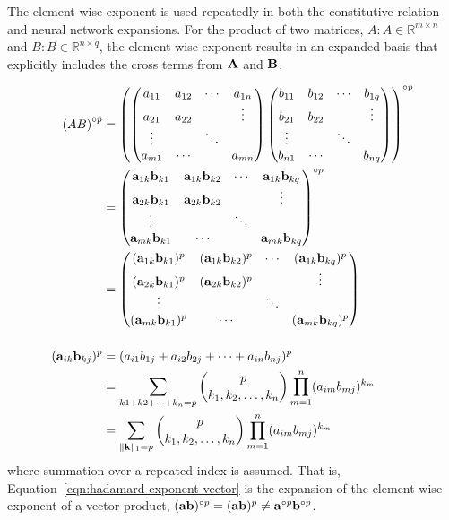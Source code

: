 {\color{red}
The element-wise exponent is used repeatedly in both the constitutive relation and neural network expansions. For the product of two matrices, $A: A \in \mathbb{R}^{m \times n}$ and $B: B \in \mathbb{R}^{n \times q}$, the element-wise exponent results in an expanded basis that explicitly includes the cross terms from ${\bf A}$ and ${\bf B}$.

\begin{subequations}
\begin{align}
        \left( AB \right)^{\circ p} &= \he[\left( \densematrix{a}{m}{n} \densematrix{b}{n}{q} \right)]{p} \nonumber \\
            &= \begin{pmatrix}
                {\bf a}_{1k}{\bf b}_{k1}  & {\bf a}_{1k}{\bf b}_{k2}    & \cdots    & {\bf a}_{1k}{\bf b}_{kq}   \\
                {\bf a}_{2k}{\bf b}_{k1}  & {\bf a}_{2k}{\bf b}_{k2}    &           & \vdots \\
                \vdots                    &                             & \ddots    &          \\
                {\bf a}_{mk}{\bf b}_{k1}  & \cdots                      &           & {\bf a}_{mk}{\bf b}_{kq}
            \end{pmatrix}^{\circ p} \nonumber \\
            &= \begin{pmatrix}
                ({\bf a}_{1k}{\bf b}_{k1})^{p}  & ({\bf a}_{1k}{\bf b}_{k2})^{p}    & \cdots    & ({\bf a}_{1k}{\bf b}_{kq})^{p}   \\
                ({\bf a}_{2k}{\bf b}_{k1})^{p}  & ({\bf a}_{2k}{\bf b}_{k2})^{p}    &           & \vdots \\
                \vdots                          &                                   & \ddots           &          \\
                ({\bf a}_{mk}{\bf b}_{k1})^{p}  & \cdots                            &           & ({\bf a}_{mk}{\bf b}_{kq})^{p}
            \end{pmatrix} \label{eqn:hadmard exponent matrix} \\[3ex]
        ({\bf a}_{ik}{\bf b}_{kj})^{p} &= (a_{i1}b_{1j} + a_{i2}b_{2j} + \cdots + a_{in}b_{nj})^p \nonumber \\
            &= \sum_{k1 + k2 + \cdots + k_n = p} \binom{p}{k_1, k_2, \ldots, k_n} \prod_{m=1}^n (a_{im}b_{mj})^{k_m} \nonumber \\
            &= \sum_{\| {\bf k} \|_1 = p} \binom{p}{k_1, k_2, \ldots, k_n} \prod_{m=1}^n (a_{im}b_{mj})^{k_m} \\%
    \label{eqn:hadamard exponent vector}
\end{align}
\label{eqn:nondistributive hadamard}
\end{subequations}
where summation over a repeated index is assumed. That is, Equation~\ref{eqn:hadamard exponent vector} is the expansion of the element-wise exponent of a vector product, $({\bf a}{\bf b})\he{p} = ({\bf a}{\bf b})^p \ne \he[{\bf a}]{p}\he[{\bf b}]{p}$.
}

